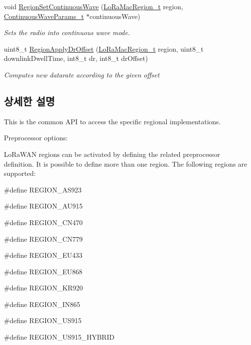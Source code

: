 \begin{DoxyCompactItemize}
void \mbox{\hyperlink{group___r_e_g_i_o_n_ga22327f217ed10d84c89b6785143be5b8}{Region\+Set\+Continuous\+Wave}} (\mbox{\hyperlink{group___l_o_r_a_m_a_c_ga80c48efda9ae02e14b58160d34a798dd}{Lo\+Ra\+Mac\+Region\+\_\+t}} region, \mbox{\hyperlink{group___r_e_g_i_o_n_gaf39bb5ba06921139c6d17f88a8d518cd}{Continuous\+Wave\+Params\+\_\+t}} $\ast$continuous\+Wave)
\begin{DoxyCompactList}\small\item\em Sets the radio into continuous wave mode. \end{DoxyCompactList}\item 
uint8\+\_\+t \mbox{\hyperlink{group___r_e_g_i_o_n_gab62221e1ca566a89f4b450b30bfb95a7}{Region\+Apply\+Dr\+Offset}} (\mbox{\hyperlink{group___l_o_r_a_m_a_c_ga80c48efda9ae02e14b58160d34a798dd}{Lo\+Ra\+Mac\+Region\+\_\+t}} region, uint8\+\_\+t downlink\+Dwell\+Time, int8\+\_\+t dr, int8\+\_\+t dr\+Offset)
\begin{DoxyCompactList}\small\item\em Computes new datarate according to the given offset \end{DoxyCompactList}\end{DoxyCompactItemize}


\subsection{상세한 설명}
This is the common A\+PI to access the specific regional implementations.

Preprocessor options\+:
\begin{DoxyItemize}
\item Lo\+Ra\+W\+AN regions can be activated by defining the related preprocessor definition. It is possible to define more than one region. The following regions are supported\+:
\begin{DoxyItemize}
\item \#define R\+E\+G\+I\+O\+N\+\_\+\+A\+S923
\item \#define R\+E\+G\+I\+O\+N\+\_\+\+A\+U915
\item \#define R\+E\+G\+I\+O\+N\+\_\+\+C\+N470
\item \#define R\+E\+G\+I\+O\+N\+\_\+\+C\+N779
\item \#define R\+E\+G\+I\+O\+N\+\_\+\+E\+U433
\item \#define R\+E\+G\+I\+O\+N\+\_\+\+E\+U868
\item \#define R\+E\+G\+I\+O\+N\+\_\+\+K\+R920
\item \#define R\+E\+G\+I\+O\+N\+\_\+\+I\+N865
\item \#define R\+E\+G\+I\+O\+N\+\_\+\+U\+S915
\item \#define R\+E\+G\+I\+O\+N\+\_\+\+U\+S915\+\_\+\+H\+Y\+B\+R\+ID 
\end{DoxyItemize}
\end{DoxyItemize}

